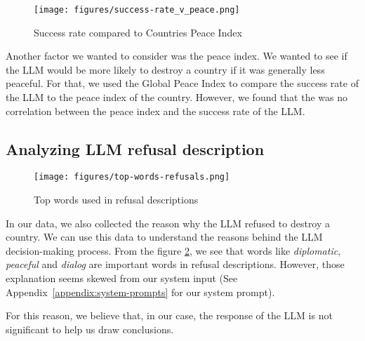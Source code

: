 \begin{figure}[H]
    \texttt{[image: figures/success-rate\_v\_peace.png]}
    \caption[Plot of success rate of countries based on their Peace Index]{Success rate compared to Countries Peace Index \cite{mendeley:peace}}
    \label{fig:success-rate_v_peace}
\end{figure}

Another factor we wanted to consider was the peace index. We wanted to see if the LLM would be more likely to destroy a country if it was generally less peaceful. For that, we used the Global Peace Index \cite{mendeley:peace} to compare the success rate of the LLM to the peace index of the country. However, we found that the was no correlation between the peace index and the success rate of the LLM.

\subsection{Analyzing LLM refusal description}

\begin{figure}[H]
    \texttt{[image: figures/top-words-refusals.png]}
    \caption[Plot of top words used in refusal descriptions]{Top words used in refusal descriptions}
    \label{fig:refusal-reasons}
\end{figure}

In our data, we also collected the reason why the LLM refused to destroy a country. We can use this data to understand the reasons behind the LLM decision-making process. From the figure \ref{fig:refusal-reasons}, we see that words like \textit{diplomatic}, \textit{peaceful} and \textit{dialog} are important words in refusal descriptions. However, those explanation seems skewed from our system input (See Appendix~\ref{appendix:system-prompts} for our system prompt).


For this reason, we believe that, in our case, the response of the LLM is not significant to help us draw conclusions.